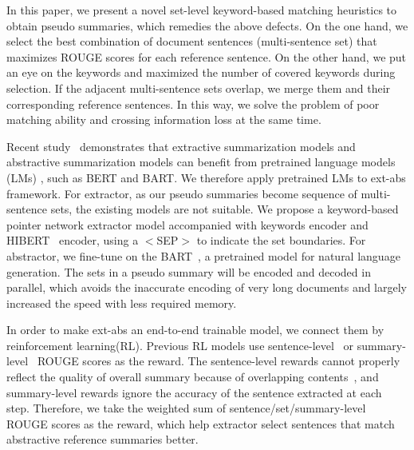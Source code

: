 In this paper, we present a novel set-level keyword-based matching heuristics
to obtain pseudo summaries, which remedies the above defects. 
On the one hand, we select the best combination of document sentences (multi-sentence set) 
that maximizes ROUGE scores for each reference sentence. 
On the other hand, we put an eye on the keywords and 
maximized the number of covered keywords during selection. 
If the adjacent multi-sentence sets overlap, 
we merge them and their corresponding reference sentences.
In this way, we solve the problem of poor matching ability and crossing information loss at the same time.

Recent study~\cite{ZhongLWQH19}
demonstrates that extractive summarization models and abstractive summarization models 
can benefit from pretrained language models (LMs)
, such as BERT and BART. 
We therefore apply pretrained LMs to ext-abs framework.
For extractor, 
as our pseudo summaries become sequence of multi-sentence sets, the existing models are not suitable. 
We propose a 
keyword-based pointer network extractor model 
accompanied with keywords encoder and 
HIBERT~\cite{HiBert19} encoder, using a $<$SEP$>$ 
to indicate the set boundaries.
For abstractor, we fine-tune on the BART~\cite{BART19}, 
a pretrained model for natural language generation. 
The sets in a pseudo summary will be encoded and decoded in parallel, 
which avoids the inaccurate encoding of very long documents and 
largely increased the speed with less required memory.

In order to make ext-abs an end-to-end trainable model, we connect them by reinforcement learning(RL). 
Previous RL models use sentence-level~\cite{FastAbs18}
or summary-level~\cite{summlevel19} ROUGE scores 
as the reward.
The sentence-level rewards cannot properly reflect the quality of overall summary
because of overlapping contents~\cite{NarayanCL18,summlevel19},
and summary-level rewards ignore the accuracy of the sentence extracted at each step.
Therefore, we take the weighted sum of sentence/set/summary-level ROUGE scores 
as the reward, 
which help extractor select sentences that match abstractive reference summaries better.

